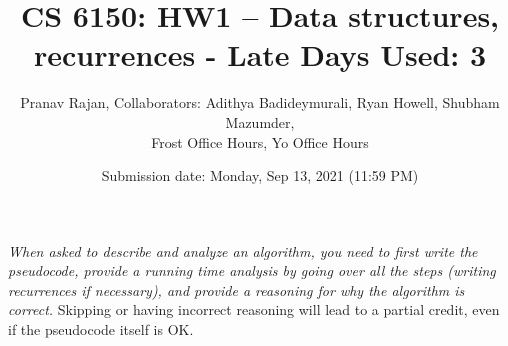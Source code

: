 \documentclass[addpoints, 11pt]{exam}
\title{CS 6150: HW1 -- Data structures, recurrences - Late Days Used: 3}
\date{Submission date: Monday, Sep 13, 2021 (11:59 PM)}
\author{Pranav Rajan, Collaborators: Adithya Badideymurali, Ryan Howell, Shubham Mazumder,\\
Frost Office Hours, Yo Office Hours}
\begin{document}
\maketitle
\begin{center}
\end{center}

\pointname{}
\bonuspointname{}
\pointformat{[\bfseries\thepoints]}

\begin{center}
  \gradetable
\end{center}
\newpage

 \emph{When asked to describe and analyze an algorithm, you need to first write the pseudocode, provide a running time analysis by going over all the steps (writing recurrences if necessary), and provide a reasoning for why the algorithm is correct.} Skipping or having incorrect reasoning will lead to a partial credit, even if the pseudocode itself is OK.
\end{document}
